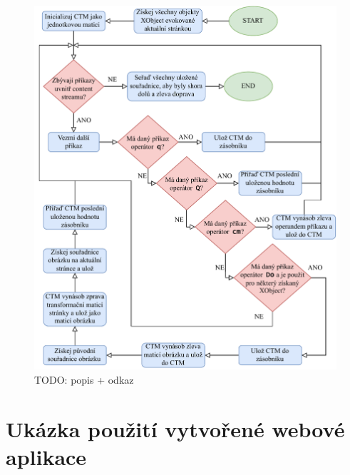 \begin{figure}[H]
    \label{pic_embedded_pdf_flow_chart}
    \centering
    \includegraphics[width=\linewidth]{obrazky-figures/embedded_pdf_flow_chart.pdf}
    \caption{TODO: popis + odkaz}
\end{figure}



\section{Ukázka použití vytvořené webové aplikace}

\dummyShortText[13]

\dummyText


\dummyShortText[8]


\dummyText

